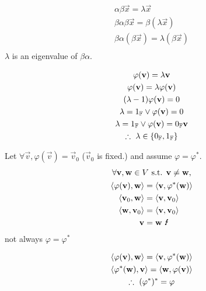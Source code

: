 \documentclass{mathtoolkit}
\begin{document}
\begin{p}
  \item
    \begin{gather*}
      \alpha \beta \vec{x} = \lambda \vec{x} \\
      \beta \alpha \beta \vec{x} = \beta (\lambda \vec{x}) \\
      \beta \alpha (\beta \vec{x}) = \lambda (\beta \vec{x}) \\
    \end{gather*}
    \therefore $\lambda$ is an eigenvalue of $\beta \alpha$.

  \item
    \begin{subp}
      \item
        \begin{gather*}
          \varphi(\vec{v}) = \lambda \vec{v} \\
          \varphi(\vec{v}) = \lambda \varphi(\vec{v}) \\
          (\lambda - 1) \varphi(\vec{v}) = 0 \\
          \lambda = 1_\field{F} \vee \varphi(\vec{v}) = 0 \\
          \lambda = 1_\field{F} \vee \varphi(\vec{v}) = 0_\field{F} \vec{v} \\
          \therefore \lambda \in \left\{ 0_\field{F}, 1_\field{F} \right\}
        \end{gather*}

      \item
        Let $\forall \vec{v}, \varphi(\vec{v}) = \vec{v}_0$ ($\vec{v}_0$ is fixed.)
        and assume $\varphi = \varphi^*$.
        \begin{gather*}
          \forall \vec{v}, \vec{w} \in V \st \vec{v} \ne \vec{w}, \\
          \begin{aligned}
            \ip{\varphi(\vec{v})}{\vec{w}} & = \ip{\vec{v}}{\varphi^*(\vec{w})} \\
            \ip{\vec{v}_0}{\vec{w}} & = \ip{\vec{v}}{\vec{v}_0} \\
            \ip{\vec{w}}{\vec{v}_0} & = \ip{\vec{v}}{\vec{v}_0} \\
            \vec{v} & = \vec{w} \contradiction
          \end{aligned}
        \end{gather*}
        \therefore not always $\varphi = \varphi^*$
    \end{subp}

  \item
    \begin{subp}
      \item
        \begin{gather*}
          \ip{\varphi(\vec{v})}{\vec{w}} = \ip{\vec{v}}{\varphi^*(\vec{w})} \\
          \ip{\varphi^*(\vec{w})}{\vec{v}} = \ip{\vec{w}}{\varphi(\vec{v})} \\
          \therefore (\varphi^*)^* = \varphi
        \end{gather*}


\end{subp}
\end{p}
\end{document}
